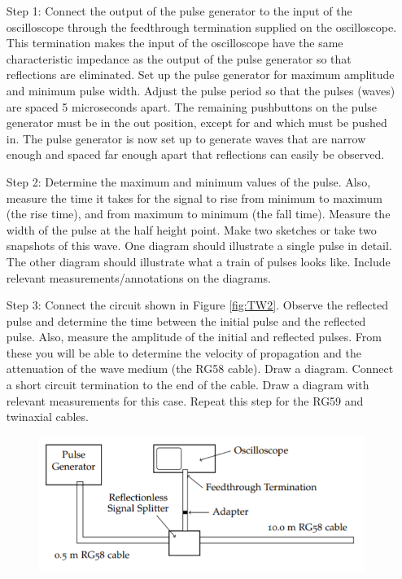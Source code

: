 \documentclass[12pt, a4paper, oneside, openright, titlepage]{book}
\begin{document}
\begin{itemize}[leftmargin = 50pt]
    \item[Step 1:] Connect the output of the pulse generator to the input of the oscilloscope through the feedthrough termination supplied on the oscilloscope. This termination makes the input of the oscilloscope have the same characteristic impedance as the output of the pulse generator so that reflections are eliminated. Set up the pulse generator for maximum amplitude and minimum pulse width. Adjust the pulse period so that the pulses (waves) are spaced 5 microseconds apart. The remaining pushbuttons on the pulse generator must be in the out position, except for  and  which must be pushed in. The pulse generator is now set up to generate waves that are narrow enough and spaced far enough apart that reflections can easily be observed.
    \item[Step 2:] Determine the maximum and minimum values of the pulse. Also, measure the time it takes for the signal to rise from minimum to maximum (the rise time), and from maximum to minimum (the fall time). Measure the width of the pulse at the half height point. Make two sketches or take two snapshots of this wave. One diagram should illustrate a single pulse in detail. The other diagram should illustrate what a train of pulses looks like. Include relevant measurements/annotations on the diagrams.
    \item[Step 3:] Connect the circuit shown in Figure \ref{fig:TW2}. Observe the reflected pulse and determine the time between the initial pulse and the reflected pulse. Also, measure the amplitude of the initial and reflected pulses. From these you will be able to determine the velocity of propagation and the attenuation of the wave medium (the RG58 cable). Draw a diagram. Connect a short circuit termination to the end of the cable. Draw a diagram with relevant measurements for this case. Repeat this step for the RG59 and twinaxial cables.
        \begin{figure}[H]
    \centering
    \includegraphics[scale = 0.8]{Images/TW2.PNG}

\end{figure}
\end{itemize}
\end{document}
